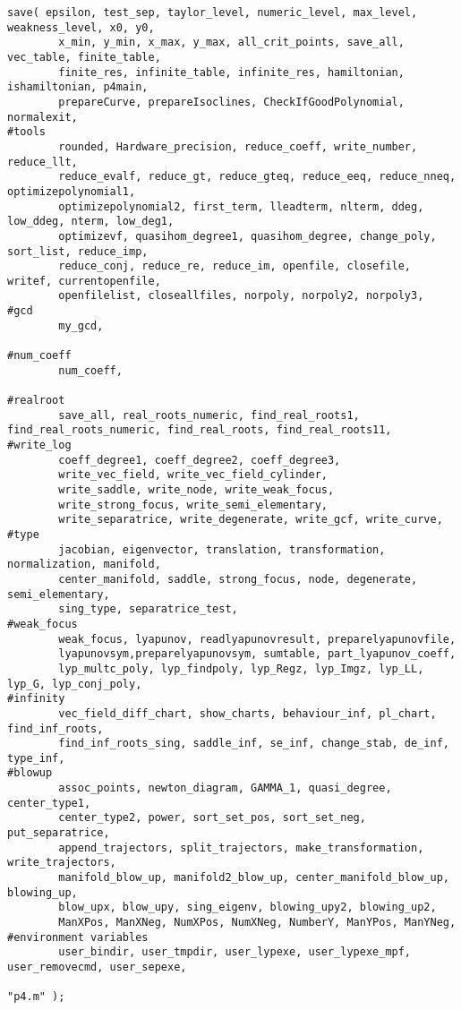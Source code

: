 \documentclass[a4paper,10pt]{article}
\begin{document}
\begin{lstlisting}[name=main]
save( epsilon, test_sep, taylor_level, numeric_level, max_level, weakness_level, x0, y0,
        x_min, y_min, x_max, y_max, all_crit_points, save_all, vec_table, finite_table,
        finite_res, infinite_table, infinite_res, hamiltonian, ishamiltonian, p4main,
        prepareCurve, prepareIsoclines, CheckIfGoodPolynomial, normalexit,
#tools
        rounded, Hardware_precision, reduce_coeff, write_number, reduce_llt,
        reduce_evalf, reduce_gt, reduce_gteq, reduce_eeq, reduce_nneq, optimizepolynomial1, 
        optimizepolynomial2, first_term, lleadterm, nlterm, ddeg, low_ddeg, nterm, low_deg1, 
        optimizevf, quasihom_degree1, quasihom_degree, change_poly, sort_list, reduce_imp, 
        reduce_conj, reduce_re, reduce_im, openfile, closefile, writef, currentopenfile, 
        openfilelist, closeallfiles, norpoly, norpoly2, norpoly3,
#gcd
        my_gcd,

#num_coeff
        num_coeff,

#realroot
        save_all, real_roots_numeric, find_real_roots1, find_real_roots_numeric, find_real_roots, find_real_roots11,
#write_log
        coeff_degree1, coeff_degree2, coeff_degree3,
        write_vec_field, write_vec_field_cylinder,
        write_saddle, write_node, write_weak_focus,
        write_strong_focus, write_semi_elementary,
        write_separatrice, write_degenerate, write_gcf, write_curve,
#type
        jacobian, eigenvector, translation, transformation, normalization, manifold,
        center_manifold, saddle, strong_focus, node, degenerate, semi_elementary,
        sing_type, separatrice_test,
#weak_focus
        weak_focus, lyapunov, readlyapunovresult, preparelyapunovfile,
        lyapunovsym,preparelyapunovsym, sumtable, part_lyapunov_coeff,
        lyp_multc_poly, lyp_findpoly, lyp_Regz, lyp_Imgz, lyp_LL, lyp_G, lyp_conj_poly,
#infinity
        vec_field_diff_chart, show_charts, behaviour_inf, pl_chart, find_inf_roots, 
        find_inf_roots_sing, saddle_inf, se_inf, change_stab, de_inf, type_inf,
#blowup
        assoc_points, newton_diagram, GAMMA_1, quasi_degree, center_type1,
        center_type2, power, sort_set_pos, sort_set_neg, put_separatrice,
        append_trajectors, split_trajectors, make_transformation, write_trajectors,
        manifold_blow_up, manifold2_blow_up, center_manifold_blow_up, blowing_up,
        blow_upx, blow_upy, sing_eigenv, blowing_upy2, blowing_up2,
        ManXPos, ManXNeg, NumXPos, NumXNeg, NumberY, ManYPos, ManYNeg,
#environment variables
        user_bindir, user_tmpdir, user_lypexe, user_lypexe_mpf, user_removecmd, user_sepexe,

"p4.m" );
\end{lstlisting}
\end{document}
